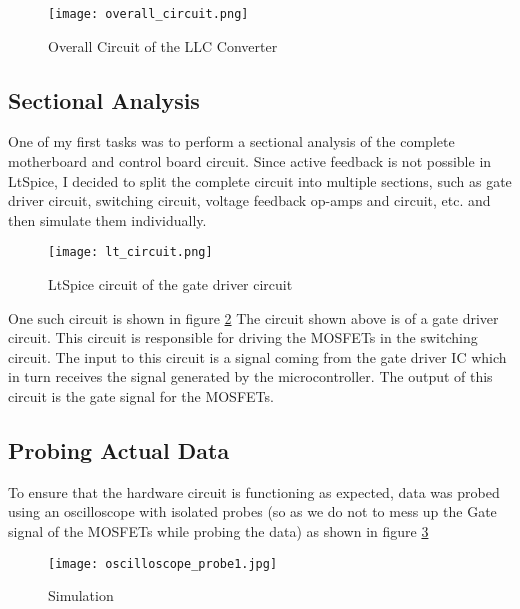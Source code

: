 \begin{figure}[H]
    \centering
    \texttt{[image: overall\_circuit.png]}
    \caption{Overall Circuit of the LLC Converter}
    \label{fig:Simulation1}
\end{figure}

\subsection{Sectional Analysis}
One of my first tasks was to perform a sectional analysis of the complete motherboard and control board circuit.
\noindent
Since active feedback is not possible in LtSpice, I decided to split the complete circuit into multiple sections, such as gate driver circuit, switching circuit, voltage feedback op-amps and circuit, etc. and then simulate them individually.\\
\begin{figure}[H]
    \centering
    \texttt{[image: lt\_circuit.png]}
    \caption{LtSpice circuit of the gate driver circuit}
    \label{fig:lt_circuit}
\end{figure}

\noindent
One such circuit is shown in figure \ref*{fig:lt_circuit}
\noindent
The circuit shown above is of a gate driver circuit. This circuit is responsible for driving the MOSFETs in the switching circuit. The input to this circuit is a signal coming from the gate driver IC which in turn receives the signal generated by the microcontroller. The output of this circuit is the gate signal for the MOSFETs.\\

\subsection{Probing Actual Data}
To ensure that the hardware circuit is functioning as expected, data was probed using an oscilloscope with isolated probes (so as we do not to mess up the Gate signal of the MOSFETs while probing the data) as shown in figure \ref*{fig:oscilloscope_probe}
\begin{figure}[H]
    \centering
    \texttt{[image: oscilloscope\_probe1.jpg]}
    \caption{Simulation}
    \label{fig:oscilloscope_probe}
\end{figure}

